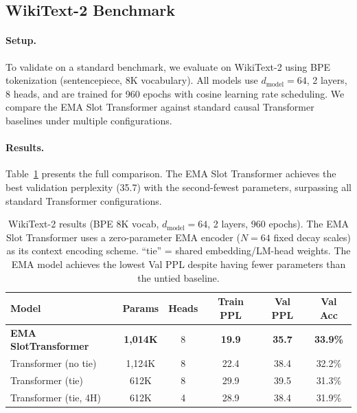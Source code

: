 \documentclass[11pt]{article}
\begin{document}
\subsection{WikiText-2 Benchmark}
\label{sec:wikitext2}

\paragraph{Setup.}
To validate on a standard benchmark, we evaluate on WikiText-2 \cite{merity2017} using BPE tokenization (sentencepiece, 8K vocabulary). All models use $d_{\text{model}} = 64$, 2 layers, 8 heads, and are trained for 960 epochs with cosine learning rate scheduling. We compare the EMA Slot Transformer against standard causal Transformer baselines under multiple configurations.

\paragraph{Results.}
Table~\ref{tab:wikitext2} presents the full comparison. The EMA Slot Transformer achieves the best validation perplexity (35.7) with the second-fewest parameters, surpassing all standard Transformer configurations.

\begin{table}[t]
\centering
\begin{tabular}{l c c c c c}
\toprule
Model & Params & Heads & Train PPL & Val PPL & Val Acc \\
\midrule
\textbf{EMA SlotTransformer} & \textbf{1,014K} & 8 & \textbf{19.9} & \textbf{35.7} & \textbf{33.9\%} \\
\midrule
Transformer (no tie) & 1,124K & 8 & 22.4 & 38.4 & 32.2\% \\
Transformer (tie) & 612K & 8 & 29.9 & 39.5 & 31.3\% \\
Transformer (tie, 4H) & 612K & 4 & 28.9 & 38.4 & 31.9\% \\
\bottomrule
\end{tabular}
\caption{WikiText-2 results (BPE 8K vocab, $d_{\text{model}}=64$, 2 layers, 960 epochs). The EMA Slot Transformer uses a zero-parameter EMA encoder ($N=64$ fixed decay scales) as its context encoding scheme. ``tie'' = shared embedding/LM-head weights. The EMA model achieves the lowest Val PPL despite having fewer parameters than the untied baseline.}
\label{tab:wikitext2}
\end{table}
\end{document}
